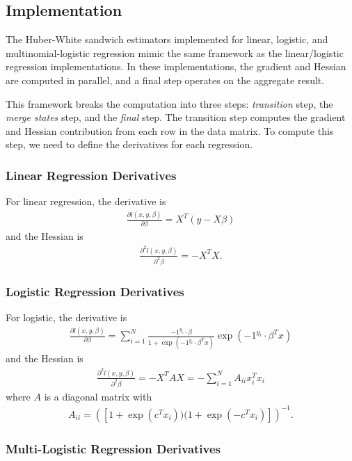 \subsection{Implementation}

The Huber-White sandwich estimators implemented for linear, logistic, and multinomial-logistic regression mimic the same framework as  the linear/logistic regression implementations.  In these implementations, the gradient and Hessian are computed in parallel, and a final step operates on the aggregate result.

This framework breaks the computation into three steps: \textit{transition} step, the \textit{merge states} step, and the \textit{final} step.  The transition step computes the gradient and Hessian contribution from each row in the data matrix.  To compute this step, we need to define the derivatives for each regression.
\subsubsection{Linear Regression Derivatives}
For linear regression, the derivative is
\begin{align}
\frac{\partial l(x,y,\beta)}{\partial \beta} = X^T(y - X \beta)
\end{align}
and the Hessian is
\begin{align}
\frac{\partial^2 l(x,y,\beta)}{\partial^2 \beta} = -X^TX.
\end{align}

\subsubsection{Logistic Regression Derivatives}
For logistic, the derivative is
\begin{align}
\frac{\partial l(x,y,\beta)}{\partial \beta} = \sum_{i=1}^N \frac{-1^{y_i}\cdot \beta}{1 + \exp(-1^{y_i} \cdot  \beta^Tx)}  \exp(-1^{y_i}\cdot \beta^Tx)
\end{align}
and the Hessian is
\begin{align}
\frac{\partial^2 l(x,y,\beta)}{\partial^2 \beta} = -X^TAX = -\sum_{i=1}^N A_{ii} x_i^T x_i
\end{align}
where $A$ is a diagonal matrix with
\begin{align}
A_{ii} = \left( [1 + \exp(c^Tx_i) ) (1 + \exp(-c^Tx_i)] \right)^{-1}.
\end{align}

\subsubsection{Multi-Logistic Regression Derivatives}

